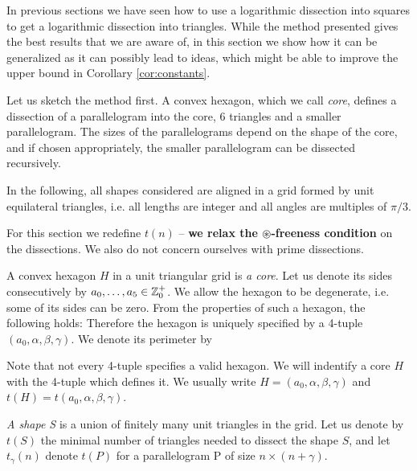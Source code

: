 In previous sections we have seen how to use a logarithmic dissection into squares to get a logarithmic dissection into triangles. While the method presented gives the best results that we are aware of, in this section we show how it can be generalized as it can possibly lead to ideas, which might be able to improve the upper bound in Corollary \ref{cor:constants}.

Let us sketch the method first. A convex hexagon, which we call \emph{core}, defines a dissection of a parallelogram into the core, 6 triangles and a smaller parallelogram. The sizes of the parallelograms depend on the shape of the core, and if chosen appropriately, the smaller parallelogram can be dissected recursively.

In the following, all shapes considered are aligned in a grid formed by unit equilateral triangles, i.e. all lengths are integer and all angles are multiples of $\pi/3$.

For this section we redefine $t(n)$ -- \textbf{we relax the $\circledast$-freeness condition} on the dissections. We also do not concern ourselves with prime dissections.

\begin{defn}
A convex hexagon $H$ in a unit triangular grid is \emph{a core}. Let us denote its sides consecutively by $a_0,\dots,a_5 \in \mathbb Z_0^+$. We allow the hexagon to be degenerate, i.e. some of its sides can be zero. From the properties of such a hexagon, the following holds:
Therefore the hexagon is uniquely specified by a 4-tuple $(a_0, \alpha, \beta, \gamma)$. We denote its perimeter by
\end{defn}

Note that not every 4-tuple specifies a valid hexagon. We will indentify a core $H$ with the 4-tuple which defines it. We usually write $H = (a_0, \alpha, \beta, \gamma)$ and $t(H) = t(a_0, \alpha, \beta, \gamma)$.

\begin{defn}
\emph{A shape S} is a union of finitely many unit triangles in the grid. Let us denote by $t(S)$ the minimal number of triangles needed to dissect the shape $S$, and let $t_\gamma(n)$ denote $t(P)$ for a parallelogram P of size $n \times (n+\gamma)$.
\end{defn}

